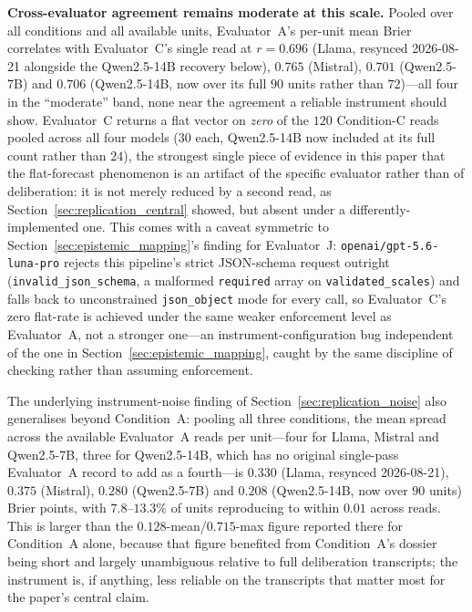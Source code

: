\documentclass[11pt,journal,onecolumn]{IEEEtran}
\begin{document}
\textbf{Cross-evaluator agreement remains moderate at this scale.} Pooled over all conditions and all available units, Evaluator~A's per-unit mean Brier correlates with Evaluator~C's single read at $r = 0.696$ (Llama, resynced 2026-08-21 alongside the Qwen2.5-14B recovery below), $0.765$ (Mistral), $0.701$ (Qwen2.5-7B) and $0.706$ (Qwen2.5-14B, now over its full $90$ units rather than $72$)---all four in the ``moderate'' band, none near the agreement a reliable instrument should show. Evaluator~C returns a flat vector on \emph{zero} of the $120$ Condition-C reads pooled across all four models ($30$ each, Qwen2.5-14B now included at its full count rather than $24$), the strongest single piece of evidence in this paper that the flat-forecast phenomenon is an artifact of the specific evaluator rather than of deliberation: it is not merely reduced by a second read, as Section~\ref{sec:replication_central} showed, but absent under a differently-implemented one. This comes with a caveat symmetric to Section~\ref{sec:epistemic_mapping}'s finding for Evaluator~J: \texttt{openai/gpt-5.6-luna-pro} rejects this pipeline's strict JSON-schema request outright (\texttt{invalid\_json\_schema}, a malformed \texttt{required} array on \texttt{validated\_scales}) and falls back to unconstrained \texttt{json\_object} mode for every call, so Evaluator~C's zero flat-rate is achieved under the same weaker enforcement level as Evaluator~A, not a stronger one---an instrument-configuration bug independent of the one in Section~\ref{sec:epistemic_mapping}, caught by the same discipline of checking rather than assuming enforcement.

The underlying instrument-noise finding of Section~\ref{sec:replication_noise} also generalises beyond Condition~A: pooling all three conditions, the mean spread across the available Evaluator~A reads per unit---four for Llama, Mistral and Qwen2.5-7B, three for Qwen2.5-14B, which has no original single-pass Evaluator~A record to add as a fourth---is $0.330$ (Llama, resynced 2026-08-21), $0.375$ (Mistral), $0.280$ (Qwen2.5-7B) and $0.208$ (Qwen2.5-14B, now over $90$ units) Brier points, with $7.8$--$13.3\%$ of units reproducing to within $0.01$ across reads. This is larger than the $0.128$-mean/$0.715$-max figure reported there for Condition~A alone, because that figure benefited from Condition~A's dossier being short and largely unambiguous relative to full deliberation transcripts; the instrument is, if anything, less reliable on the transcripts that matter most for the paper's central claim.
\end{document}
